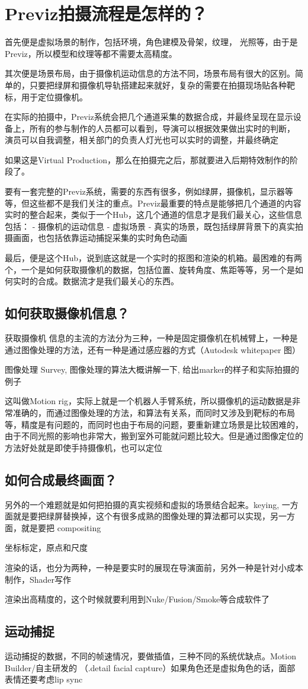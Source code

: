 \section*{Previz拍摄流程是怎样的？}
首先便是虚拟场景的制作，包括环境，角色建模及骨架，纹理， 光照等，由于是Previz，所以模型和纹理等都不需要太高精度。

其次便是场景布局，由于摄像机运动信息的方法不同，场景布局有很大的区别。简单的，只要把绿屏和摄像机导轨搭建起来就好，复杂的需要在拍摄现场贴各种靶标，用于定位摄像机。

在实际的拍摄中，Previz系统会把几个通道采集的数据合成，并最终呈现在显示设备上，所有的参与制作的人员都可以看到，导演可以根据效果做出实时的判断， 演员可以自我调整，相关部门的负责人灯光也可以实时的调整，并最终确定

如果这是Virtual Production，那么在拍摄完之后，那就要进入后期特效制作的阶段了。 


要有一套完整的Previz系统，需要的东西有很多，例如绿屏，摄像机，显示器等等，但这些都不是我们关注的重点。Previz最重要的特点是能够把几个通道的内容实时的整合起来，类似于一个Hub，这几个通道的信息才是我们最关心，这些信息包括：
- 摄像机的运动信息
- 虚拟场景
- 真实的场景，既包括绿屏背景下的真实拍摄画面，也包括依靠运动捕捉采集的实时角色动画 

最后，便是这个Hub，说到底这就是一个实时的抠图和渲染的机箱。最困难的有两个，一个是如何获取摄像机的数据，包括位置、旋转角度、焦距等等，另一个是如何实时的合成。数据流才是我们最关心的东西。

\subsection*{如何获取摄像机信息？}
获取摄像机  信息的主流的方法分为三种，一种是固定摄像机在机械臂上，一种是通过图像处理的方法，还有一种是通过感应器的方式（Autodesk whitepaper 图）

图像处理 Survey, 图像处理的算法大概讲解一下, 给出marker的样子和实际拍摄的例子


这叫做Motion rig，实际上就是一个机器人手臂系统，所以摄像机的运动数据是非常准确的，而通过图像处理的方法，和算法有关系，而同时又涉及到靶标的布局等，精度是有问题的，而同时也由于布局的问题，要重新建立场景是比较困难的，由于不同光照的影响也非常大，搬到室外可能就问题比较大。但是通过图像定位的方法好处就是即使手持摄像机，也可以定位

\subsection*{如何合成最终画面？}
另外的一个难题就是如何把拍摄的真实视频和虚拟的场景结合起来。keying, 一方面就是要把绿屏替换掉，这个有很多成熟的图像处理的算法都可以实现，另一方面，就是要把 compositing 


坐标标定，原点和尺度


渲染的话，也分为两种，一种是要实时的展现在导演面前，另外一种是针对小成本制作，Shader写作


渲染出高精度的，这个时候就要利用到Nuke/Fusion/Smoke等合成软件了 

\subsection*{运动捕捉}

运动捕捉的数据，不同的帧速情况，要做插值，三种不同的系统优缺点。Motion Builder/自主研发的 （.detail facial capture）如果角色还是虚拟角色的话，面部表情还要考虑lip sync



